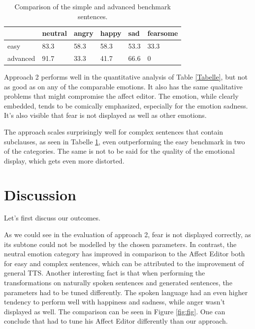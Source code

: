 \documentclass[11pt]{article}
\begin{document}
\begin{table}[h]

\small
\vspace{5px}
{
\begin{tabular}{|l|l|l|l|l|l|}
\hline
\rowcolor{mintgreen}&neutral&angry&happy&sad&fearsome\\
\hline
\cellcolor{gainsboro}easy&83.3&58.3&58.3&53.3&33.3\\
\hline
\cellcolor{gainsboro}advanced&91.7&33.3&41.7&66.6&0\\
\hline
\end{tabular}
}

\caption{Comparison of the simple and advanced benchmark sentences.}
\label{Tabelle2}
\end{table}

Approach 2 performs well in the quantitative analysis of Table \ref{Tabelle}, but not as good as \cite{cahn_generation_2000} on any of the comparable emotions. It also has the same qualitative problems that might compromise the affect editor. The emotion, while clearly embedded, tends to be comically emphasized, especially for the emotion sadness. It's also visible that fear is not displayed as well as other emotions.

The approach scales surprisingly well for complex sentences that contain subclauses, as seen in Tabelle \ref{Tabelle2}, even outperforming the easy benchmark in two of the categories. The same is not to be said for the quality of the emotional display, which gets even more distorted.


\section{Discussion}
\label{discussion}
Let's first discuss our outcomes.


As we could see in the evaluation of approach 2, fear is not displayed correctly, as its subtone could not be modelled by the chosen parameters. In contrast, the neutral emotion category has improved in comparison to the Affect Editor both for easy and complex sentences, which can be attributed to the improvement of general TTS. Another interesting fact is that when performing the transformations on naturally spoken sentences and generated sentences, the parameters had to be tuned differently. The spoken language had an even higher tendency to perform well with happiness and sadness, while anger wasn't displayed as well. The comparison can be seen in Figure \ref{fig:fig}. One can conclude that \cite{cahn_generation_2000} had to tune his Affect Editor differently than our approach.
\end{document}
